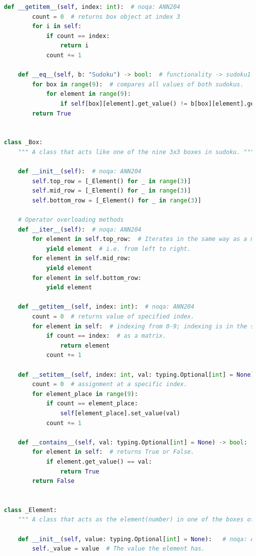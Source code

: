 \documentclass[12pt, a4paper]{report}
\begin{document}
\begin{lstlisting}[language=Python, caption=utils/classes.py]
    def __getitem__(self, index: int):  # noqa: ANN204
        count = 0  # returns box object at index 3
        for i in self:
            if count == index:
                return i
            count += 1

    def __eq__(self, b: "Sudoku") -> bool:  # functionality -> sudoku1 == sudoku2
        for box in range(9):  # compares all values of both sudokus.
            for element in range(9):
                if self[box][element].get_value() != b[box][element].get_value(): return False
        return True


class _Box:
    """ A class that acts like one of the nine 3x3 boxes in sudoku. """

    def __init__(self):  # noqa: ANN204
        self.top_row = [_Element() for _ in range(3)]
        self.mid_row = [_Element() for _ in range(3)]
        self.bottom_row = [_Element() for _ in range(3)]

    # Operator overloading methods
    def __iter__(self):  # noqa: ANN204
        for element in self.top_row:  # Iterates in the same way as a matrix
            yield element  # i.e. from left to right.
        for element in self.mid_row:
            yield element
        for element in self.bottom_row:
            yield element

    def __getitem__(self, index: int):  # noqa: ANN204
        count = 0  # returns value of specified index.
        for element in self:  # indexing from 0-9; indexing is in the same way
            if count == index:  # as a matrix.
                return element
            count += 1

    def __setitem__(self, index: int, val: typing.Optional[int] = None):  # noqa: ANN204
        count = 0  # assignment at a specific index.
        for element_place in range(9):
            if count == element_place:
                self[element_place].set_value(val)
            count += 1

    def __contains__(self, val: typing.Optional[int] = None) -> bool:  # functionality -> val in box
        for element in self:  # returns True or False.
            if element.get_value() == val:
                return True
        return False


class _Element:
    """ A class that acts as the element(number) in one of the boxes of sudoku. """

    def __init__(self, value: typing.Optional[int] = None):   # noqa: ANN204
        self._value = value  # The value the element has.


\end{lstlisting}
\end{document}
